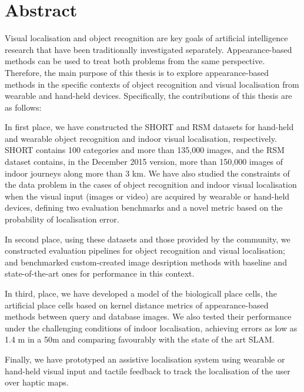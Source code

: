 \begingroup
\let\clearpage\relax
\let\cleardoublepage\relax
\let\cleardoublepage\relax

\chapter*{Abstract}

Visual localisation and object recognition are key goals of artificial intelligence research that have been traditionally investigated separately. Appearance-based methods can be used to treat both problems from the same perspective. Therefore, the main purpose of this thesis is to explore appearance-based methods in the specific contexts of object recognition and visual localisation from wearable and hand-held devices. Specifically, the contributions of this thesis are as follows:

In first place, we have constructed the SHORT and RSM datasets for hand-held and wearable object recognition and indoor visual localisation, respectively. SHORT contains 100 categories and more than 135,000 images, and the RSM dataset contains, in the December 2015 version, more than 150,000 images of indoor journeys along more than 3 km. We have also studied the constraints of the data problem in the cases of object recognition and indoor visual localisation when the visual input (images or video) are acquired by wearable or hand-held devices, defining two evaluation benchmarks and a novel metric based on the probability of localisation error. 

In second place, using these datasets and those provided by the community, we constructed evaluation pipelines for object recognition and visual localisation; and benchmarked custom-created image desription methods with baseline and state-of-the-art ones for performance in this context. 

In third, place, we have developed a model of the biologicall place cells, the artificial place cells based on kernel distance metrics of appearance-based methods between query and database images. We also tested their performance under the challenging conditions of indoor localisation, achieving errors as low as 1.4 m in a 50m and comparing favourably with the state of the art SLAM. 

Finally, we have prototyped an assistive localisation system using wearable or hand-held visual input and tactile feedback to track the localisation of the user over haptic maps.


\vfill



\endgroup			

\vfill